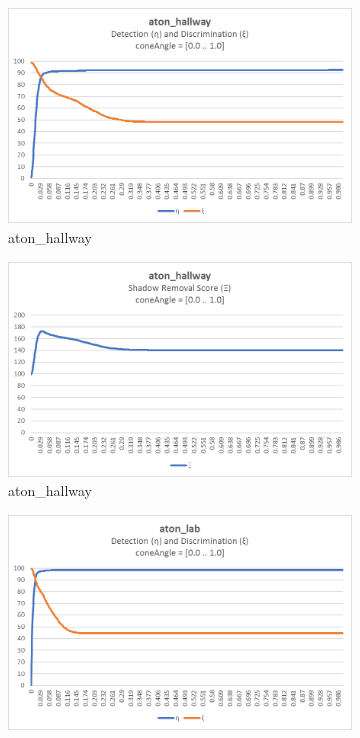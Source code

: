 \begin{appendices}
\begin{figure}
  \begin{subfigure}{.45\linewidth}
  \includegraphics[width=1\linewidth]{figures/appendix/hallway_coneAngle_response.jpg}
  \caption{aton\_hallway}
\end{subfigure}
\hfill
\begin{subfigure}{.45\linewidth}
  \includegraphics[width=1\linewidth]{figures/appendix/hallway_coneAngle_score.jpg}
  \caption{aton\_hallway}
\end{subfigure}
\hfill
\begin{subfigure}{.45\linewidth}
  \includegraphics[width=1\linewidth]{figures/appendix/lab_coneAngle_response.jpg}

\end{subfigure}
\end{figure}
\end{appendices}
